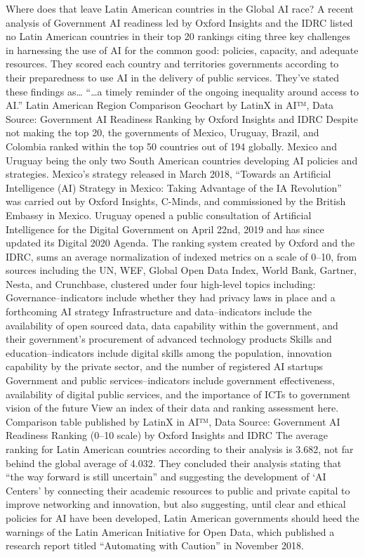 \documentclass[journal]{IEEEtran}
\begin{document}
Where does that leave Latin American countries in the Global AI race?
A recent analysis of Government AI readiness led by Oxford Insights and the IDRC listed no Latin American countries in their top 20 rankings citing three key challenges in harnessing the use of AI for the common good: policies, capacity, and adequate resources. They scored each country and territories governments according to their preparedness to use AI in the delivery of public services. They’ve stated these findings as…
“…a timely reminder of the ongoing inequality around access to AI.”
Latin American Region Comparison Geochart by LatinX in AI™, Data Source: Government AI Readiness Ranking by Oxford Insights and IDRC
Despite not making the top 20, the governments of Mexico, Uruguay, Brazil, and Colombia ranked within the top 50 countries out of 194 globally. Mexico and Uruguay being the only two South American countries developing AI policies and strategies. Mexico’s strategy released in March 2018, “Towards an Artificial Intelligence (AI) Strategy in Mexico: Taking Advantage of the IA Revolution” was carried out by Oxford Insights, C-Minds, and commissioned by the British Embassy in Mexico. Uruguay opened a public consultation of Artificial Intelligence for the Digital Government on April 22nd, 2019 and has since updated its Digital 2020 Agenda.
The ranking system created by Oxford and the IDRC, sums an average normalization of indexed metrics on a scale of 0–10, from sources including the UN, WEF, Global Open Data Index, World Bank, Gartner, Nesta, and Crunchbase, clustered under four high-level topics including:
Governance--indicators include whether they had privacy laws in place and a forthcoming AI strategy
Infrastructure and data--indicators include the availability of open sourced data, data capability within the government, and their government’s procurement of advanced technology products
Skills and education--indicators include digital skills among the population, innovation capability by the private sector, and the number of registered AI startups
Government and public services--indicators include government effectiveness, availability of digital public services, and the importance of ICTs to government vision of the future
View an index of their data and ranking assessment here.
Comparison table published by LatinX in AI™, Data Source: Government AI Readiness Ranking (0–10 scale) by Oxford Insights and IDRC
The average ranking for Latin American countries according to their analysis is 3.682, not far behind the global average of 4.032. They concluded their analysis stating that “the way forward is still uncertain” and suggesting the development of ‘AI Centers’ by connecting their academic resources to public and private capital to improve networking and innovation, but also suggesting, until clear and ethical policies for AI have been developed, Latin American governments should heed the warnings of the Latin American Initiative for Open Data, which published a research report titled “Automating with Caution” in November 2018.
\end{document}
